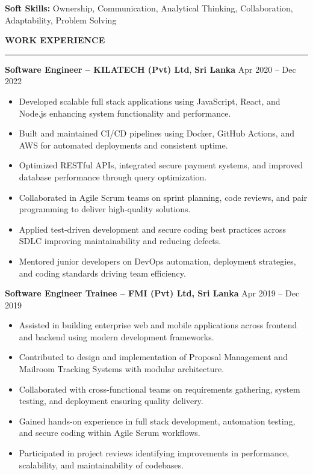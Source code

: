 \documentclass[10pt,letterpaper]{article}
\begin{document}
\textbf{Soft Skills:} Ownership, Communication, Analytical Thinking, Collaboration, Adaptability, Problem Solving

\vspace{8pt}

\textbf{WORK EXPERIENCE}\\[-8pt]
\noindent\rule{\textwidth}{1pt}

\vspace{-2pt}

\textbf{Software Engineer -- KILATECH (Pvt) Ltd}, \textbf{Sri Lanka} \hfill Apr 2020 -- Dec 2022

\vspace{-1pt}

\begin{itemize}
\item Developed scalable full stack applications using JavaScript, React, and Node.js enhancing system functionality and performance.
\item Built and maintained CI/CD pipelines using Docker, GitHub Actions, and AWS for automated deployments and consistent uptime.
\item Optimized RESTful APIs, integrated secure payment systems, and improved database performance through query optimization.
\item Collaborated in Agile Scrum teams on sprint planning, code reviews, and pair programming to deliver high-quality solutions.
\item Applied test-driven development and secure coding best practices across SDLC improving maintainability and reducing defects.
\item Mentored junior developers on DevOps automation, deployment strategies, and coding standards driving team efficiency.
\end{itemize}

\textbf{Software Engineer Trainee -- FMI (Pvt) Ltd, Sri Lanka} \hfill Apr 2019 -- Dec 2019

\vspace{-1pt}

\begin{itemize}
\item Assisted in building enterprise web and mobile applications across frontend and backend using modern development frameworks.
\item Contributed to design and implementation of Proposal Management and Mailroom Tracking Systems with modular architecture.
\item Collaborated with cross-functional teams on requirements gathering, system testing, and deployment ensuring quality delivery.
\item Gained hands-on experience in full stack development, automation testing, and secure coding within Agile Scrum workflows.
\item Participated in project reviews identifying improvements in performance, scalability, and maintainability of codebases.
\end{itemize}
\end{document}
